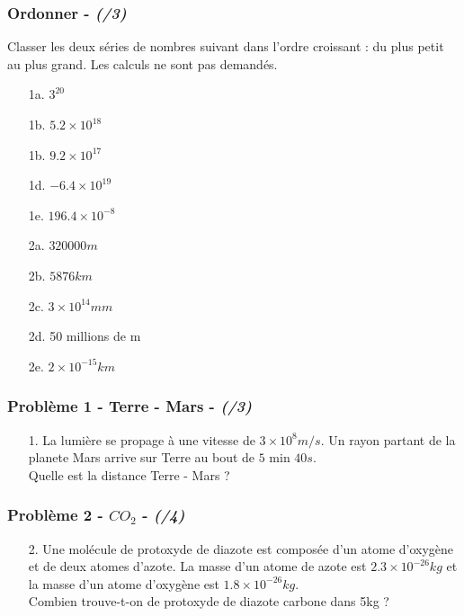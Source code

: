 \documentclass[11pt]{article}
\begin{document}
\subsubsection*{Ordonner - \textit{(/3)}}
Classer les deux séries de nombres suivant dans l'ordre croissant : du plus petit au plus grand. Les calculs ne sont pas demandés.
\begin{multicols}{2}

\begin{enumerate}
  \item[1a.] $ 3^{20} $
  \item[1b.] $ 5.2 \times 10^{18} $ 
  \item[1b.] $ 9.2 \times 10^{17} $ 
  \item[1d.] $ -6.4 \times 10^{19} $ 
  \item[1e.] $ 196.4 \times 10^{-8} $ 
\end{enumerate}
\begin{enumerate}
  \item[2a.] $ 320000 m $
  \item[2b.] $ 5876 km $ 
  \item[2c.] $ 3 \times 10^{14} mm $
  \item[2d.] 50 millions de m
  \item[2e.] $ 2 \times 10^{-15} km $
\end{enumerate}

\end{multicols}

\subsubsection*{Problème 1 - Terre - Mars  - \textit{(/3)}}
\begin{enumerate}
\item[1.] La lumière se propage à une vitesse de $3 \times 10^8 m/s$. Un rayon partant de la planete Mars arrive sur Terre au bout de $5 \text{ min } 40s$. \\
Quelle est la distance Terre - Mars ?
\end{enumerate}

\subsubsection*{Problème 2 - $CO_2$  - \textit{(/4)}}

\begin{enumerate}
  \item[2.] Une molécule de protoxyde de diazote est composée d'un atome d'oxygène et de deux atomes d'azote. La masse d'un atome de azote est $2.3 \times 10^{-26}kg$ et la masse d'un atome d'oxygène est $1.8 \times 10^{-26}kg$. \\
  Combien trouve-t-on de protoxyde de diazote carbone dans 5kg ?
\end{enumerate}
\end{document}
